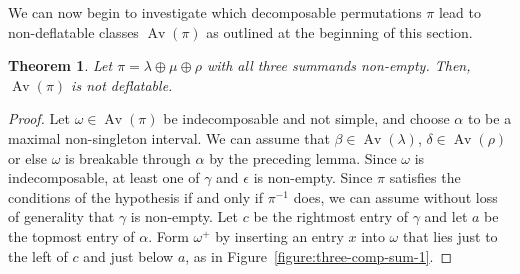 \documentclass[10pt]{article}
\theoremstyle{plain}
\newtheorem{theorem}{Theorem}[section]
\newcommand{\Av}{\operatorname{Av}}
\begin{document}
We can now begin to investigate which decomposable permutations $\pi$ lead to non-deflatable classes $\Av(\pi)$ as outlined at the beginning of this section.
\begin{theorem}
	\label{theorem:three-comp-sum}
	Let $\pi = \lambda \oplus \mu \oplus \rho$ with all three summands non-empty. Then, $\Av(\pi)$ is not deflatable.
\end{theorem}
\begin{proof}
	Let $\omega \in \Av(\pi)$ be indecomposable and not simple, and choose $\alpha$ to be a maximal non-singleton interval. We can assume that $\beta \in \Av(\lambda)$, $\delta \in \Av(\rho)$ or else $\omega$ is breakable through $\alpha$ by the preceding lemma. Since $\omega$ is indecomposable, at least one of $\gamma$ and $\epsilon$ is non-empty. Since $\pi$ satisfies the conditions of the hypothesis if and only if $\pi^{-1}$ does, we can assume without loss of generality that $\gamma$ is non-empty. Let $c$ be the rightmost entry of $\gamma$ and let $a$ be the topmost entry of $\alpha$. Form $\omega^+$ by inserting an entry $x$ into $\omega$ that lies just to the left of $c$ and just below $a$, as in Figure~\ref{figure:three-comp-sum-1}.


\end{proof}
\end{document}
